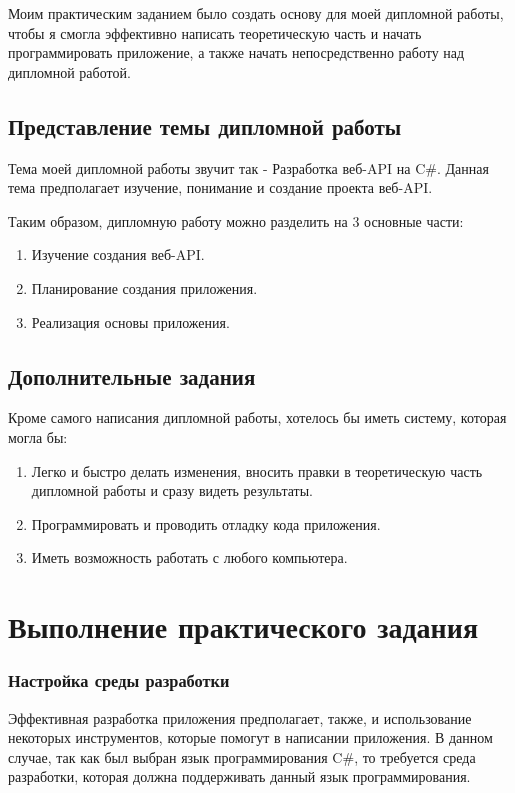 \documentclass[a4paper,12pt]{report}
\begin{document}
Моим практическим заданием было создать основу для моей дипломной работы, чтобы я смогла эффективно написать теоретическую часть и начать 
программировать приложение, а также начать непосредственно работу над дипломной работой.


\section{Представление темы дипломной работы}

Тема моей дипломной работы звучит так - Разработка веб-\ac{API} на C\#.
Данная тема предполагает изучение, понимание и создание проекта веб-\ac{API}.

Таким образом, дипломную работу можно разделить на 3 основные части:
\begin{enumerate}
  \item Изучение создания веб-\ac{API}.
  \item Планирование создания приложения.
  \item Реализация основы приложения.
\end{enumerate}

\section{Дополнительные задания}

Кроме самого написания дипломной работы, хотелось бы иметь систему, которая могла бы:
\begin{enumerate}
  \item Легко и быстро делать изменения, вносить правки в теоретическую часть дипломной работы и сразу видеть результаты.
  \item Программировать и проводить отладку кода приложения.
  \item Иметь возможность работать с любого компьютера.
\end{enumerate}

\chapter{Выполнение практического задания}

\subsection{Настройка среды разработки}

Эффективная разработка приложения предполагает, также, и использование некоторых инструментов, которые помогут в написании приложения.
В данном случае, так как был выбран язык программирования C\#, то требуется среда разработки, которая должна поддерживать данный язык программирования.
\end{document}
